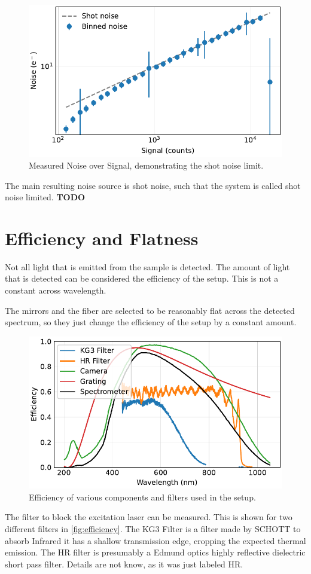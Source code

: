 \documentclass[
	parskip=half,
	a4paper,
]{scrarticle}
\begin{document}
\begin{figure}
    \centering
    \includegraphics{../analysis/figures/shot noise.pdf}
    \caption{Measured Noise over Signal, demonstrating the shot noise limit.}
    \label{fig:shotnoise}
\end{figure}
The main resulting noise source is shot noise, such that the system is called shot noise limited.
\textbf{TODO}

\section{Efficiency and Flatness}
Not all light that is emitted from the sample is detected.
The amount of light that is detected can be considered the efficiency of the setup. This is not a constant across wavelength.

The mirrors and the fiber are selected to be reasonably flat across the detected spectrum, so they just change the efficiency of the setup by a constant amount.

\begin{figure}[hb]
    \centering
    \includegraphics{../analysis/figures/filter.pdf}
    \caption{Efficiency of various components and filters used in the setup.}
    \label{fig:efficiency}
\end{figure}
The filter to block the excitation laser can be measured. This is shown for two different filters in \autoref{fig:efficiency}. The KG3 Filter is a filter made by SCHOTT to absorb Infrared it has a shallow transmission edge, cropping the expected thermal emission.
The HR filter is presumably a Edmund optics highly reflective dielectric short pass filter. Details are not know, as it was just labeled HR.
\end{document}
